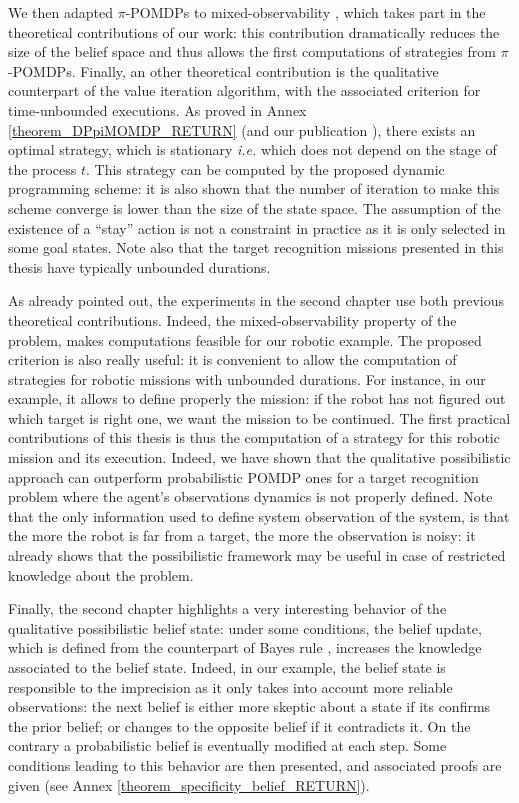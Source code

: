 We then adapted $\pi$-POMDPs 
to mixed-observability \cite{OngShaoHsuWee-IJRR10},
which takes part in the theoretical contributions of our work:
this contribution dramatically reduces the size of the belief space 
and thus allows the first computations of strategies from $\pi$-POMDPs. 
Finally, an other theoretical contribution 
is the qualitative counterpart of the value iteration algorithm,
with the associated criterion for time-unbounded executions. 
As proved in Annex \ref{theorem_DPpiMOMDP_RETURN}
(and our publication \cite{Drougard13}), 
there exists an optimal strategy, 
which is stationary 
\textit{i.e.} which does not depend on the stage of the process $t$. 
This strategy can be computed 
by the proposed dynamic programming scheme: 
it is also shown that 
the number of iteration 
to make this scheme converge 
is lower than the size of the state space.
The assumption of the existence of a ``stay'' action
is not a constraint in practice
as it is only selected 
in some goal states.
Note also that the target recognition missions 
presented in this thesis 
have typically unbounded durations.

As already pointed out,
the experiments in the second chapter 
use both previous theoretical contributions.
Indeed, the mixed-observability property of the problem,
makes computations feasible for our robotic example.
The proposed criterion is also really useful: 
it is convenient to allow 
the computation of strategies 
for robotic missions 
with unbounded durations.
For instance, in our example, 
it allows to define properly the mission: 
if the robot has not figured out 
which target is right one,
we want the mission to be continued.
The first practical contributions of this thesis 
is thus the computation of a strategy
for this robotic mission and its execution.
Indeed, we have shown 
that the qualitative possibilistic approach 
can outperform probabilistic POMDP ones 
for a target recognition problem 
where the agent's observations dynamics 
is not properly defined.
Note that the only information used 
to define system observation of the system,
is that the more the robot is far from a target, 
the more the observation is noisy:
it already shows that the possibilistic framework
may be useful in case of restricted knowledge 
about the problem.


Finally, the second chapter highlights 
a very interesting behavior 
of the qualitative possibilistic belief state:
under some conditions, 
the belief update, 
which is defined from the counterpart of Bayes rule \cite{Dubois199023},
increases the knowledge associated to the belief state.
Indeed, in our example, 
the belief state is responsible to the imprecision 
as it only takes into account 
more reliable observations:
the next belief is either more skeptic 
about a state if its confirms the prior belief; 
or changes to the opposite belief if it contradicts it.
On the contrary a probabilistic belief 
is eventually modified at each step. 
Some conditions leading to this behavior 
are then presented,
and associated proofs are given 
(see Annex \ref{theorem_specificity_belief_RETURN}).

